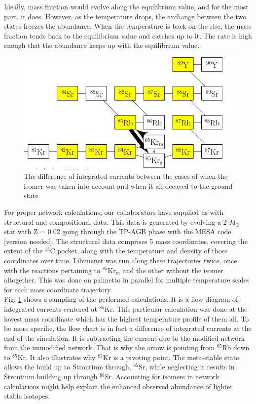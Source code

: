 \documentclass{article}
\begin{document}
Ideally, mass fraction would evolve along the equilibrium value, and for the most part, it does. However, as the temperature drops, 
the exchange between the two states freezes the abundance. When the temperature is back on the rise, the mass fraction tends back to 
the equilibrium value and catches up to it. The rate is high enough that the abundance keeps up with the equilibrium value.\\

\begin{figure}[H]
    \centerline{\includegraphics[scale = 0.5]{images/sample_branch.png}}
    \caption{The difference of integrated currents between the cases of when the isomer was taken into account and when it all decayed to the ground state}
    \label{int_cur}
\end{figure}

For proper network calculations, our collaborators have supplied us with structural and compositional data. This data is generated 
by evolving a 2 $M_{\odot}$ star with Z = 0.02 going through the TP-AGB phase with the MESA code [version needed]\cite{paxton2010modules,paxton2013modules,paxton2015modules,paxton2018modules,paxton2019modules}.
The structural data comprises 5 mass coordinates, covering the extent of the $^{13}$C pocket, along with the temperature and density 
of those coordinates over time. Libnucnet was run along these trajectories twice, once with the reactions pertaining to $^{85}$Kr$_{m}$ 
and the other without the isomer altogether. This was done on palmetto in parallel for multiple temperature scales for each mass 
coordinate trajectory.\\

Fig. \ref{int_cur} shows a sampling of the performed calculations. It is a flow diagram of integrated currents centered at $^{85}$Kr. 
This particular calculation was done at the lowest mass coordinate which has the highest temperature profile of them all. To be more 
specific, the flow chart is in fact a difference of integrated currents at the end of the simulation. It is subtracting the current 
due to the modified network from the unmodified network. That is why the arrow is pointing from $^{85}$Rb down to $^{85}$Kr. It 
also illustrates why $^{85}$Kr is a pivoting point. The meta-stable state allows the build up to Strontium through, $^{85}$Sr, while 
neglecting it results in Strontium building up through $^{88}$Sr. Accounting for isomers in network calculations might help explain 
the enhanced observed abundance of lighter stable isotopes.
\end{document}
